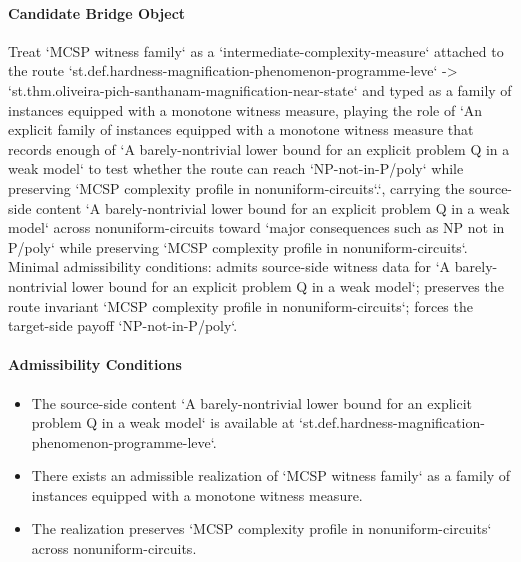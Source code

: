 \documentclass[11pt]{article}
\begin{document}
\paragraph{Candidate Bridge Object}
Treat `MCSP witness family` as a `intermediate-complexity-measure` attached to the route `st.def.hardness-magnification-phenomenon-programme-leve` -> `st.thm.oliveira-pich-santhanam-magnification-near-state` and typed as a family of instances equipped with a monotone witness measure, playing the role of `An explicit family of instances equipped with a monotone witness measure that records enough of `A barely-nontrivial lower bound for an explicit problem Q in a weak model` to test whether the route can reach `NP-not-in-P/poly` while preserving `MCSP complexity profile in nonuniform-circuits`.`, carrying the source-side content `A barely-nontrivial lower bound for an explicit problem Q in a weak model` across nonuniform-circuits toward `major consequences such as NP not in P/poly` while preserving `MCSP complexity profile in nonuniform-circuits`. Minimal admissibility conditions: admits source-side witness data for `A barely-nontrivial lower bound for an explicit problem Q in a weak model`; preserves the route invariant `MCSP complexity profile in nonuniform-circuits`; forces the target-side payoff `NP-not-in-P/poly`.
\paragraph{Admissibility Conditions}
\begin{itemize}
\item The source-side content `A barely-nontrivial lower bound for an explicit problem Q in a weak model` is available at `st.def.hardness-magnification-phenomenon-programme-leve`.
\item There exists an admissible realization of `MCSP witness family` as a family of instances equipped with a monotone witness measure.
\item The realization preserves `MCSP complexity profile in nonuniform-circuits` across nonuniform-circuits.
\end{itemize}
\end{document}
